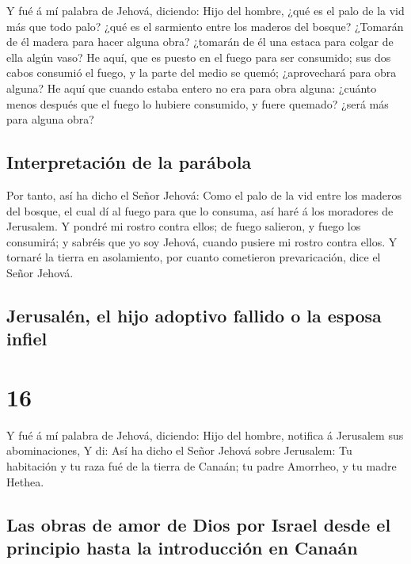  Y fué á mí palabra de Jehová, diciendo: 
Hijo del hombre, ¿qué es el palo de la vid más que todo palo? ¿qué es el
sarmiento entre los maderos del bosque?  ¿Tomarán de él
madera para hacer alguna obra? ¿tomarán de él una estaca para colgar de
ella algún vaso?  He aquí, que es puesto en el fuego para
ser consumido; sus dos cabos consumió el fuego, y la parte del medio se
quemó; ¿aprovechará para obra alguna?  He aquí que cuando
estaba entero no era para obra alguna: ¿cuánto menos después que el
fuego lo hubiere consumido, y fuere quemado? ¿será más para alguna obra?

\hypertarget{interpretaciuxf3n-de-la-paruxe1bola}{%
\subsection{Interpretación de la
parábola}\label{interpretaciuxf3n-de-la-paruxe1bola}}

 Por tanto, así ha dicho el Señor Jehová: Como el palo de
la vid entre los maderos del bosque, el cual dí al fuego para que lo
consuma, así haré á los moradores de Jerusalem.  Y pondré
mi rostro contra ellos; de fuego salieron, y fuego los consumirá; y
sabréis que yo soy Jehová, cuando pusiere mi rostro contra ellos.
 Y tornaré la tierra en asolamiento, por cuanto cometieron
prevaricación, dice el Señor Jehová.

\hypertarget{jerusaluxe9n-el-hijo-adoptivo-fallido-o-la-esposa-infiel}{%
\subsection{Jerusalén, el hijo adoptivo fallido o la esposa
infiel}\label{jerusaluxe9n-el-hijo-adoptivo-fallido-o-la-esposa-infiel}}

\hypertarget{section-15}{%
\section{16}\label{section-15}}

 Y fué á mí palabra de Jehová, diciendo: 
Hijo del hombre, notifica á Jerusalem sus abominaciones, 
Y di: Así ha dicho el Señor Jehová sobre Jerusalem: Tu habitación y tu
raza fué de la tierra de Canaán; tu padre Amorrheo, y tu madre Hethea.

\hypertarget{las-obras-de-amor-de-dios-por-israel-desde-el-principio-hasta-la-introducciuxf3n-en-canauxe1n}{%
\subsection{Las obras de amor de Dios por Israel desde el principio
hasta la introducción en
Canaán}\label{las-obras-de-amor-de-dios-por-israel-desde-el-principio-hasta-la-introducciuxf3n-en-canauxe1n}}

